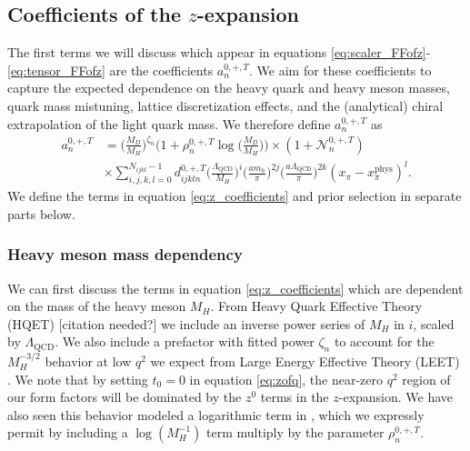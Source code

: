 \subsection{Coefficients of the $z$-expansion}\label{sec:coef_z_expand}
The first terms we will discuss which appear in equations \ref{eq:scaler_FFofz}-\ref{eq:tensor_FFofz} are the coefficients $a_n^{0,+,T}$.  We aim for these coefficients to capture the expected dependence on the heavy quark and heavy meson masses, quark mass mistuning, lattice discretization effects, and the (analytical) chiral extrapolation of the light quark mass.  We therefore define $a_n^{0,+,T}$ as
\begin{equation}\label{eq:z_coefficients}
    \begin{split}
        a_n^{0,+,T}&=
          {\Big(\frac{M_D}{M_H}\Big)^{{\zeta_n}}\Big(1+{\rho_n^{0,+,T}}\log\Big(\frac{M_D}{M_H}\Big)\Big)} \times(1+{\mathcal{N}^{0,+,T}_n})\\
          &\times
          \sum_{i,j,k,l=0}^{N_{ijkl}-1} d_{ijkln}^{0,+,T}\Big(\frac{\Lambda_{\mathrm{QCD}}}{M_{H}}\Big)^{{i}} 
          \Big(\frac{am_h}{\pi}\Big)^{2{j}}
          {\Big(\frac{a\Lambda_{\mathrm{QCD}}}{\pi}\Big)^{2k}}
          {(x_{\pi}-x_{\pi}^{\mathrm{phys}})^{l}}.
    \end{split}
\end{equation}
We define the terms in equation \ref{eq:z_coefficients} and prior selection in separate parts below.

\subsubsection{Heavy meson mass dependency}
We can first discuss the terms in equation \ref{eq:z_coefficients} which are dependent on the mass of the heavy meson $M_H$. From Heavy Quark Effective Theory (HQET) [citation needed?] we include an inverse power series of $M_H$ in $i$, scaled by $\Lambda_\mathrm{QCD}$.  We also include a prefactor with fitted power $\zeta_n$ to account for the $M_H^{-3/2}$ behavior at low $q^2$ we expect from Large Energy Effective Theory (LEET) \cite{Husung_2020}.  We note that by setting $t_0 = 0$ in equation \ref{eq:zofq}, the near-zero $q^2$ region of our form factors will be dominated by the $z^0$ terms in the $z$-expansion.  We have also seen this behavior modeled a logarithmic term in \cite{Will_towardsB}, which we expressly permit by including a $\log(M_H^{-1})$ term multiply by the parameter $\rho_n^{0,+,T}$.

